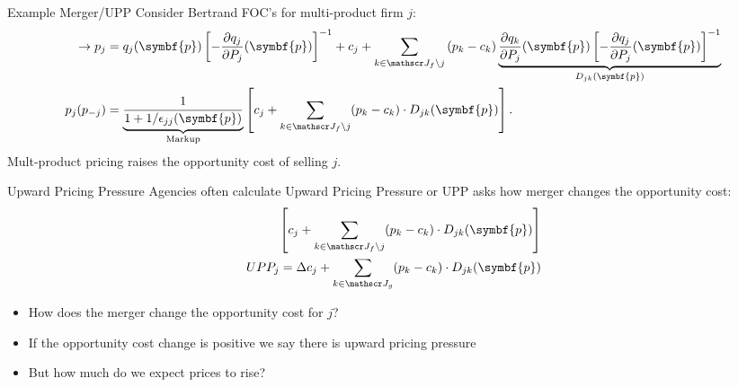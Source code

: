 \documentclass[aspectratio=169,10pt]{beamer}
\begin{document}
\begin{frame}{Example Merger/UPP}
\footnotesize
Consider Bertrand FOC's for multi-product firm $j$:
\begin{align*}
\label{eq:best_response}
\rightarrow \nonumber p_j &=q_{j}(\symbf{p}) \left[-\frac{\partial q_{j}}{\partial P_{j}}(\symbf{p})\right]^{-1} + c_{j} + \sum_{k \in \calJ_{f} \setminus j} \left(p_{k}-c_{k}\right) \underbrace{\frac{\partial q_{k}}{\partial P_{j}}(\symbf{p})\left[-\frac{\partial q_{j}}{\partial P_{j}}(\symbf{p})\right]^{-1}}_{D_{jk}(\symbf{p})}\\
p_j(p_{-j}) &= \underbrace{\frac{1}{1+1/\epsilon_{jj}(\symbf{p})}}_{\text{Markup}} \left[ c_j + \sum_{k \in \calJ_{f} \setminus j}  (p_k-c_k) \cdot  D_{jk} (\symbf{p}) \right].
\end{align*}
Mult-product pricing \alert{raises the opportunity cost} of selling $j$.
\end{frame}

\begin{frame}{Upward Pricing Pressure}
Agencies often calculate \alert{Upward Pricing Pressure} or UPP asks how merger \alert{changes} the opportunity cost:
\begin{align*}
\left[ c_j + \sum_{k \in \calJ_{f} \setminus j}  (p_k-c_k) \cdot  D_{jk} (\symbf{p}) \right] \\
UPP_j = \Delta c_j + \sum_{k \in \calJ_{g}}  (p_k-c_k) \cdot  D_{jk} (\symbf{p}) 
\end{align*}
\begin{itemize}
    \item How does the merger change the \alert{opportunity cost} for $j$?
    \item If the opportunity cost change is positive we say there is \alert{upward pricing pressure}
    \item But how much do we expect prices to rise?
\end{itemize}
\end{frame}
\end{document}
